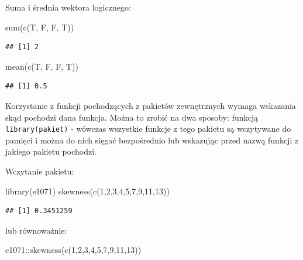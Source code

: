 \documentclass[
]{book}
\newenvironment{Shaded}{\begin{snugshade}}{\end{snugshade}}
\newcommand{\DecValTok}[1]{\textcolor[rgb]{0.00,0.00,0.81}{#1}}
\newcommand{\FunctionTok}[1]{\textcolor[rgb]{0.00,0.00,0.00}{#1}}
\newcommand{\NormalTok}[1]{#1}
\newcommand{\SpecialCharTok}[1]{\textcolor[rgb]{0.00,0.00,0.00}{#1}}
\begin{document}
Suma i średnia wektora logicznego:

\begin{Shaded}
\begin{Highlighting}[]
\FunctionTok{sum}\NormalTok{(}\FunctionTok{c}\NormalTok{(T, F, F, T))}
\end{Highlighting}
\end{Shaded}

\begin{verbatim}
## [1] 2
\end{verbatim}

\begin{Shaded}
\begin{Highlighting}[]
\FunctionTok{mean}\NormalTok{(}\FunctionTok{c}\NormalTok{(T, F, F, T))}
\end{Highlighting}
\end{Shaded}

\begin{verbatim}
## [1] 0.5
\end{verbatim}

Korzystanie z funkcji pochodzących z pakietów zewnętrznych wymaga wskazania skąd pochodzi dana funkcja. Można to zrobić na dwa sposoby: funkcją \texttt{library(pakiet)} - wówczas wszystkie funkcje z tego pakietu są wczytywane do pamięci i można do nich sięgać bezpośrednio lub wskazując przed nazwą funkcji z jakiego pakietu pochodzi.

Wczytanie pakietu:

\begin{Shaded}
\begin{Highlighting}[]
\FunctionTok{library}\NormalTok{(e1071)}
\FunctionTok{skewness}\NormalTok{(}\FunctionTok{c}\NormalTok{(}\DecValTok{1}\NormalTok{,}\DecValTok{2}\NormalTok{,}\DecValTok{3}\NormalTok{,}\DecValTok{4}\NormalTok{,}\DecValTok{5}\NormalTok{,}\DecValTok{7}\NormalTok{,}\DecValTok{9}\NormalTok{,}\DecValTok{11}\NormalTok{,}\DecValTok{13}\NormalTok{))}
\end{Highlighting}
\end{Shaded}

\begin{verbatim}
## [1] 0.3451259
\end{verbatim}

lub równoważnie:

\begin{Shaded}
\begin{Highlighting}[]
\NormalTok{e1071}\SpecialCharTok{::}\FunctionTok{skewness}\NormalTok{(}\FunctionTok{c}\NormalTok{(}\DecValTok{1}\NormalTok{,}\DecValTok{2}\NormalTok{,}\DecValTok{3}\NormalTok{,}\DecValTok{4}\NormalTok{,}\DecValTok{5}\NormalTok{,}\DecValTok{7}\NormalTok{,}\DecValTok{9}\NormalTok{,}\DecValTok{11}\NormalTok{,}\DecValTok{13}\NormalTok{))}
\end{Highlighting}
\end{Shaded}
\end{document}
